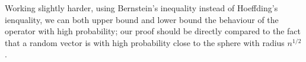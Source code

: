Working slightly harder, using Bernstein's inequality instead of Hoeffding's ienquality, we can both upper bound and lower bound the behaviour of the operator with high probability; our proof should be directly compared to the fact that a random vector is with high probability close to the sphere with radius $n^{1/2}$.
%

